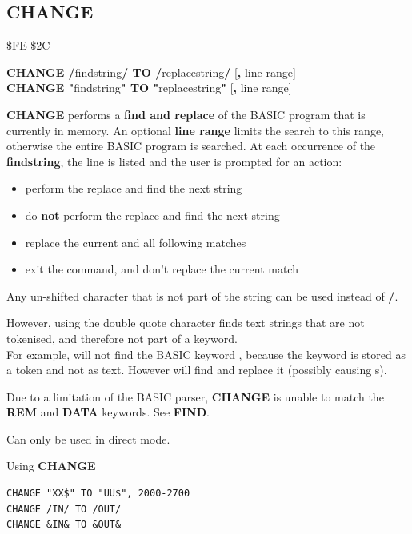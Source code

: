\newpage
\subsection{CHANGE}
\begin{description}[leftmargin=2cm,style=nextline]
\item [Token:] \$FE \$2C
\item [Format:] {\bf CHANGE /}findstring{\bf/ TO /}replacestring{\bf/} [{\bf,} line range] \\
		{\bf CHANGE "}findstring{\bf" TO "}replacestring{\bf"} [{\bf,} line range]
\item [Usage:]  {\bf CHANGE} performs a {\bf find and replace} of the BASIC program
                that is currently in memory.
   An optional {\bf line range} limits the search to this range,
   otherwise the entire BASIC program is searched.
   At each occurrence of the {\bf findstring}, the line is
   listed and the user is prompted for an action:
    \begin{itemize}
      \item {}  perform the replace and find the next string
      \item {}  do {\bf not} perform the replace and find the next string
      \item \megakey{*}  replace the current and all following matches
      \item {} exit the command, and don't replace the current match
    \end{itemize}
\item [Remarks:] Any un-shifted character that is not part of the string can be
   used instead of {\bf /}.

   However, using the double quote character finds text strings that are
   not tokenised, and therefore not part of a keyword. \\
   For example,  will not find
   the BASIC keyword , because the
   keyword is stored as a token and not as text.
   However  will
   find and replace it (possibly causing s).

   Due to a limitation of the BASIC parser, {\bf CHANGE} is unable to match
   the {\bf REM} and {\bf DATA} keywords. See {\bf FIND}.

   Can only be used in direct mode.

\item [Examples:] Using {\bf CHANGE}
\begin{tcolorbox}[colback=black,coltext=white]
\verbatimfont{\codefont}
\begin{verbatim}
CHANGE "XX$" TO "UU$", 2000-2700
CHANGE /IN/ TO /OUT/
CHANGE &IN& TO &OUT&
\end{verbatim}
\end{tcolorbox}
\end{description}


